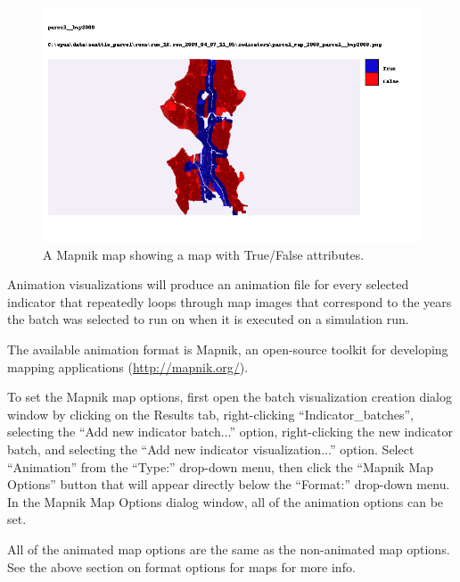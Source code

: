 \begin{figure}[hbp]
\begin{center}
\includegraphics[width=\textwidth]{part-gui/images/result-manager-TF-map.png}
\end{center}
\caption{A Mapnik map showing a map with True/False attributes.}
\label{fig:sample-map-TF-map}
\end{figure}
\clearpage


Animation visualizations will produce an animation file for every 
selected indicator that repeatedly loops through map images that 
correspond to the years the batch was selected to run on when 
it is executed on a simulation run.

The available animation format is Mapnik, an open-source toolkit for 
developing mapping applications (\url{http://mapnik.org/}).

To set the Mapnik map options, first open the batch visualization 
creation dialog window by clicking on the
Results tab, right-clicking ``Indicator_batches'', selecting the 
``Add new indicator batch...'' option, right-clicking the new 
indicator batch, and selecting the ``Add new
indicator visualization...'' option. Select ``Animation'' from the 
``Type:'' drop-down menu, then click the ``Mapnik Map
Options'' button that will appear directly below the ``Format:'' 
drop-down menu. In the Mapnik Map Options dialog
window, all of the animation options can be set.

All of the animated map options are the same as the 
non-animated map options. See the above section on format
options for maps for more info.



